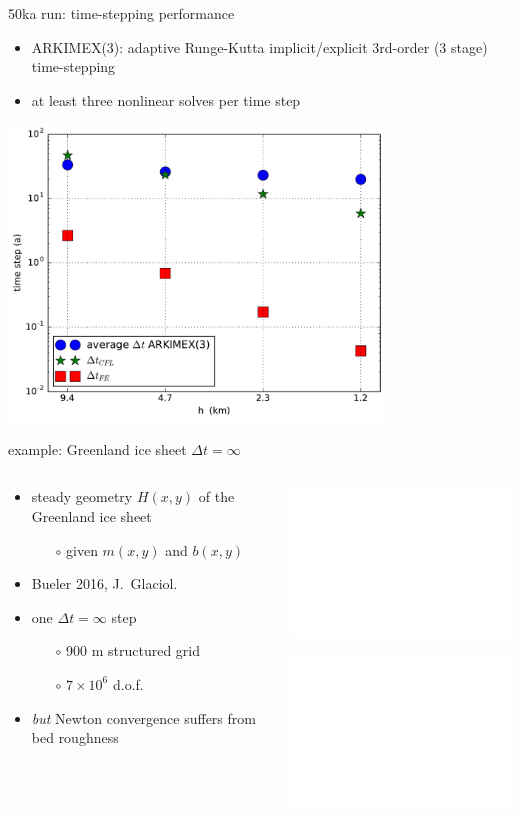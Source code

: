 \documentclass[hide notes,intlimits,usenames,dvipsnames]{beamer}
\begin{document}
\begin{frame}{50ka run: time-stepping performance}
\begin{itemize}
\item ARKIMEX(3): adaptive Runge-Kutta implicit/explicit 3rd-order (3 stage) time-stepping
\item at least three nonlinear solves per time step
\end{itemize}
\begin{center}
\includegraphics[width=0.75\textwidth]{dtfiftyka.pdf}
\end{center}
\end{frame}


\begin{frame}{example: Greenland ice sheet $\Delta t=\infty$}

\begin{columns}
\begin{column}{0.5\textwidth}
\begin{itemize}
\item steady geometry $H(x,y)$ of the Greenland ice sheet
  \begin{itemize}
  \item[$\circ$] given $m(x,y)$ and $b(x,y)$
  \end{itemize}
\item<1-2> Bueler 2016, J.~Glaciol.
\item<1> one $\Delta t=\infty$ step
  \begin{itemize}
  \item[$\circ$] 900 m structured grid
  \item[$\circ$] $7\times 10^6$ d.o.f.
  \end{itemize}

\bigskip
\item<2> \emph{but} Newton convergence suffers from bed roughness
\end{itemize}
\end{column}
\begin{column}{0.5\textwidth}
\includegraphics<1>[height=0.8\textheight]{grnwinset.pdf}

\includegraphics<2>[width=\textwidth]{rseps.pdf}
\end{column}
\end{columns}
\end{frame}
\end{document}
